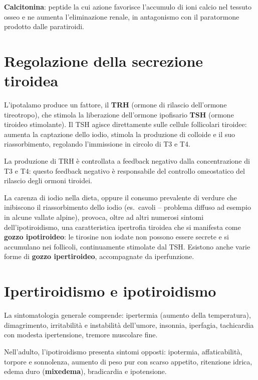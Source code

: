 \textbf{Calcitonina}: peptide la cui azione favorisce l'accumulo di ioni
calcio nel tessuto osseo e ne aumenta l'eliminazione renale, in
antagonismo con il paratormone prodotto dalle paratiroidi.

\section{Regolazione della secrezione tiroidea}

L'ipotalamo produce un fattore, il \textbf{TRH} (ormone di rilascio
dell'ormone tireotropo), che stimola la liberazione dell'ormone ipofisario
\textbf{TSH} (ormone tiroideo stimolante). Il TSH agisce direttamente sulle
cellule follicolari tiroidee: aumenta la captazione dello iodio, stimola la
produzione di colloide e il suo riassorbimento, regolando l'immissione in
circolo di T3 e T4.

La produzione di TRH è controllata a feedback negativo dalla concentrazione
di T3 e T4: questo feedback negativo è responsabile del controllo
omeostatico del rilascio degli ormoni tiroidei.

La carenza di iodio nella dieta, oppure il consumo prevalente di verdure
che inibiscono il riassorbimento dello iodio (es.\ cavoli -- problema
diffuso ad esempio in alcune vallate alpine), provoca, oltre ad altri
numerosi sintomi dell'ipotiroidismo, una caratteristica ipertrofia tiroidea
che si manifesta come \textbf{gozzo ipotiroideo}: le tirosine non iodate
non possono essere secrete e si accumulano nei follicoli, continuamente
stimolate dal TSH. Esistono anche varie forme di \textbf{gozzo
ipertiroideo}, accompagnate da iperfunzione.

\section{Ipertiroidismo e ipotiroidismo}

La sintomatologia generale comprende: ipertermia (aumento della
temperatura), dimagrimento, irritabilità e instabilità dell'umore,
insonnia, iperfagia, tachicardia con modesta ipertensione, tremore
muscolare fine.

Nell'adulto, l'ipotiroidismo presenta sintomi opposti: ipotermia,
affaticabilità, torpore e sonnolenza, aumento di peso pur con scarso
appetito, ritenzione idrica, edema duro (\textbf{mixedema}), bradicardia e
ipotensione.

